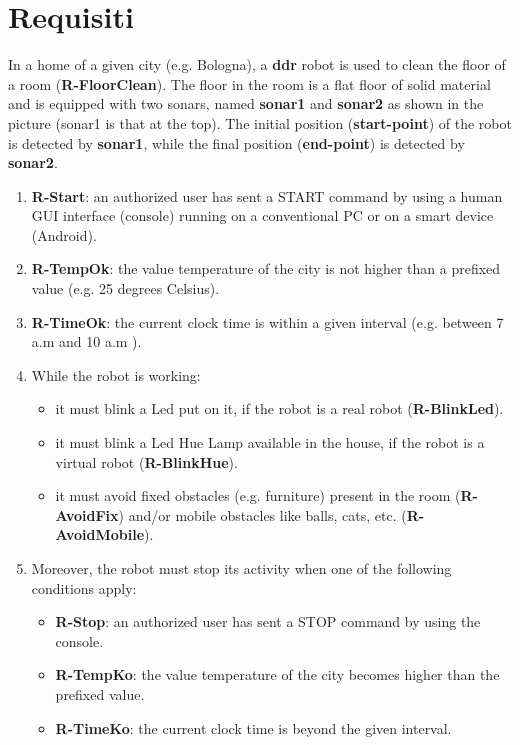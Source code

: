 \documentclass{llncs}
\begin{document}
\section{Requisiti}
In a home of a given city (e.g. Bologna), a \textbf{ddr} robot is used to clean the floor of a room (\textbf{R-FloorClean}).
The floor in the room is a flat floor of solid material and is equipped with two sonars, named \textbf{sonar1} and
\textbf{sonar2} as shown in the picture (sonar1 is that at the top). The initial position (\textbf{start-point}) of the robot is
detected by \textbf{sonar1}, while the final position (\textbf{end-point}) is detected by \textbf{sonar2}.
\label{Requirements}
\begin{enumerate}
     \item \textbf{R-Start}: an authorized user has sent a START command by using a human GUI interface (console) running on a conventional PC or on a smart device (Android).
     \item \textbf{R-TempOk}: the value temperature of the city is not higher than a prefixed value (e.g. 25 degrees Celsius).
     \item \textbf{R-TimeOk}: the current clock time is within a given interval (e.g. between 7 a.m and 10 a.m ).
     \item While the robot is working:
        \begin{itemize}
            \item it must blink a Led put on it, if the robot is a real robot (\textbf{R-BlinkLed}).
            \item it must blink a Led Hue Lamp available in the house, if the robot is a virtual robot (\textbf{R-BlinkHue}).
            \item it must avoid fixed obstacles (e.g. furniture) present in the room (\textbf{R-AvoidFix}) and/or mobile obstacles like balls, cats, etc. (\textbf{R-AvoidMobile}).
        \end{itemize}
    \item Moreover, the robot must stop its activity when one of the following conditions apply:
        \begin{itemize}
            \item \textbf{R-Stop}: an authorized user has sent a STOP command by using the console.
            \item \textbf{R-TempKo}: the value temperature of the city becomes higher than the prefixed value.
            \item \textbf{R-TimeKo}: the current clock time is beyond the given interval.

\end{itemize}
\end{enumerate}
\end{document}
